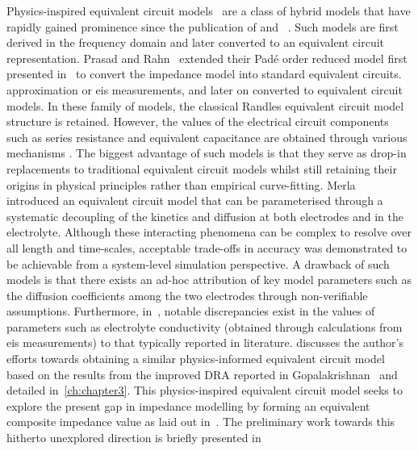 
Physics-inspired equivalent circuit models~\cite{Merla2018,Prasad2014,Zhang2017} are a class of hybrid models that have
rapidly gained prominence since the publication of\cite{Jokar2016} and ~\cite{Fan2015}. Such models are first derived in
the frequency domain and later converted to an equivalent circuit representation. Prasad and Rahn~\cite{Prasad2014}
extended their Padé order reduced model first presented in~\cite{Prasad2013} to convert the impedance model into
standard equivalent circuits. approximation or \gls{eis} measurements, and later on converted to equivalent circuit
models. In these family of models, the classical Randles equivalent circuit model structure is retained. However, the
values of the electrical circuit components such as series resistance and equivalent capacitance  are obtained through
various mechanisms . The biggest advantage of such models is that they serve as drop-in
replacements to traditional equivalent circuit models whilst still retaining their origins in physical principles rather
than empirical curve-fitting. Merla~\etal{}~\cite{Merla2018} introduced an equivalent circuit model that can be
parameterised through a systematic decoupling of the kinetics and diffusion at both electrodes and in the electrolyte.
Although these interacting phenomena can be complex to resolve over all length and time-scales, acceptable trade-offs in
accuracy was demonstrated to be achievable from a system-level simulation perspective. A drawback of such models is that
there exists an ad-hoc attribution of key model parameters such as the diffusion coefficients among the two electrodes
through non-verifiable assumptions. Furthermore, in~\cite{Merla2018}, notable discrepancies exist in the values of
parameters such as electrolyte conductivity (obtained through calculations from \gls{eis} measurements) to that
typically reported in literature.  discusses the author's efforts towards obtaining a similar
physics-informed equivalent circuit model based on the results from the improved DRA reported in
Gopalakrishnan\etal{}~\cite{Gopalakrishnan2017} and detailed in~\cref{ch:chapter3}. This physics-inspired equivalent
circuit model seeks to explore the present gap in impedance modelling by forming an equivalent composite impedance value
as laid out in~\cite{Smith2007}. The preliminary work towards this hitherto unexplored direction is briefly presented in

